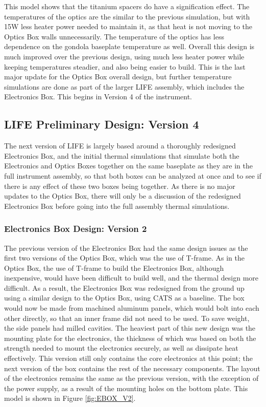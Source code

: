 This model shows that the titanium spacers do have a signification effect. The temperatures of the optics are the similar to the previous simulation, but with 15W less heater power needed to maintain it, as that heat is not moving to the Optics Box walls unnecessarily. The temperature of the optics has less dependence on the gondola baseplate temperature as well. Overall this design is much improved over the previous design, using much less heater power while keeping temperatures steadier, and also being easier to build. This is the last major update for the Optics Box overall design, but further temperature simulations are done as part of the larger LIFE assembly, which includes the Electronics Box. This begins in Version 4 of the instrument.

\subsection{LIFE Preliminary Design: Version 4} 
The next version of LIFE is largely based around a thoroughly redesigned Electronics Box, and the initial thermal simulations that simulate both the Electronics and Optics Boxes together on the same baseplate as they are in the full instrument assembly, so that both boxes can be analyzed at once and to see if there is any effect of these two boxes being together. As there is no major updates to the Optics Box, there will only be a discussion of the redesigned Electronics Box before going into the full assembly thermal simulations.

\subsubsection{Electronics Box Design: Version 2}
The previous version of the Electronics Box had the same design issues as the first two versions of the Optics Box, which was the use of T-frame. As in the Optics Box, the use of T-frame to build the Electronics Box, although inexpensive, would have been difficult to build well, and the thermal design more difficult. As a result, the Electronics Box was redesigned from the ground up using a similar design to the Optics Box, using CATS as a baseline. The box would now be made from machined aluminum panels, which would bolt into each other directly, so that an inner frame did not need to be used. To save weight, the side panels had milled cavities. The heaviest part of this new design was the mounting plate for the electronics, the thickness of which was based on both the strength needed to mount the electronics securely, as well as dissipate heat effectively. This version still only contains the core electronics at this point; the next version of the box contains the rest of the necessary components. The layout of the electronics remains the same as the previous version, with the exception of the power supply, as a result of the mounting holes on the bottom plate. This model is shown in Figure \ref{fig:EBOX_V2}.

